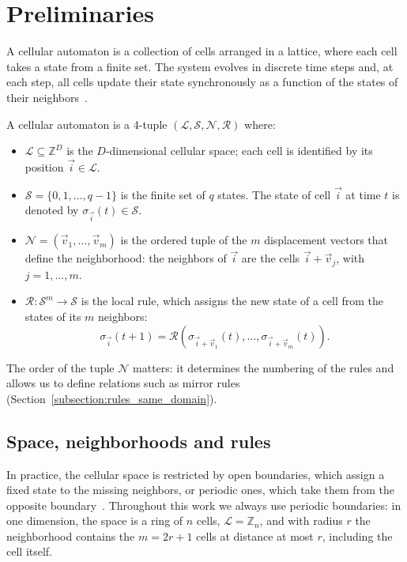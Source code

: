 \section{Preliminaries}

A cellular automaton is a collection of cells arranged in a lattice, where each cell takes a state from a finite set. The system evolves in discrete time steps and, at each step, all cells update their state synchronously as a function of the states of their neighbors~\cite{weisstein2002_ca,wolfram1982_ca,fsancho2016_ca}.

\begin{definition}
\label{def:ca}
A cellular automaton is a 4-tuple $(\mathcal{L}, \mathcal{S}, \mathcal{N}, \mathcal{R})$ where:
\begin{itemize}
    \item $\mathcal{L} \subseteq \mathbb{Z}^D$ is the $D$-dimensional cellular space; each cell is identified by its position $\vec{i} \in \mathcal{L}$.

    \item $\mathcal{S} = \{0, 1, \dots, q-1\}$ is the finite set of $q$ states. The state of cell $\vec{i}$ at time $t$ is denoted by $\sigma_{\vec{i}}(t) \in \mathcal{S}$.

    \item $\mathcal{N} = (\vec{v}_1, \dots, \vec{v}_m)$ is the ordered tuple of the $m$ displacement vectors that define the neighborhood: the neighbors of $\vec{i}$ are the cells $\vec{i} + \vec{v}_j$, with $j = 1, \dots, m$.

    \item $\mathcal{R} : \mathcal{S}^m \to \mathcal{S}$ is the local rule, which assigns the new state of a cell from the states of its $m$ neighbors:
    \[
    \sigma_{\vec{i}}(t + 1) = \mathcal{R}\left( \sigma_{\vec{i} + \vec{v}_1}(t), \dots, \sigma_{\vec{i} + \vec{v}_m}(t) \right).
    \]
\end{itemize}
\end{definition}

The order of the tuple $\mathcal{N}$ matters: it determines the numbering of the rules and allows us to define relations such as mirror rules (Section~\ref{subsection:rules_same_domain}).

\subsection{Space, neighborhoods and rules}

In practice, the cellular space is restricted by open boundaries, which assign a fixed state to the missing neighbors, or periodic ones, which take them from the opposite boundary~\cite{bhattacharjee2019_ca,ponce2015_ca}. Throughout this work we always use periodic boundaries: in one dimension, the space is a ring of $n$ cells, $\mathcal{L} = \mathbb{Z}_n$, and with radius $r$ the neighborhood contains the $m = 2r + 1$ cells at distance at most $r$, including the cell itself.

